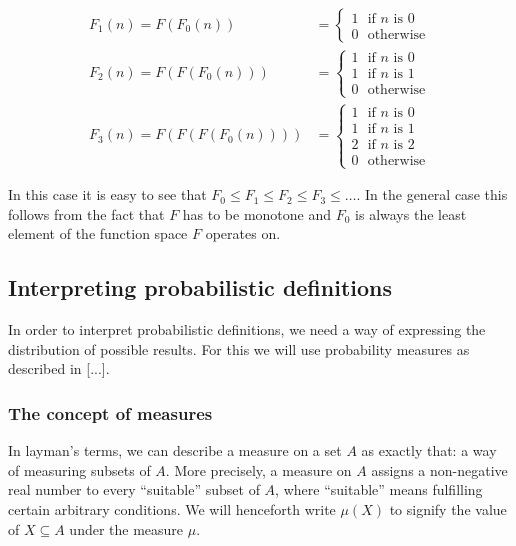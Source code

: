 \documentclass[11pt, leqno, titlepage]{article}
\theoremstyle{definition}
\begin{document}
\begin{align*}
  F_1(n) = F(F_0(n)) & = \begin{cases}
                           1~~~\text{if }n\text{ is 0}\\
                           0~~~\text{otherwise}
                         \end{cases}
  \\
  F_2(n) = F(F(F_0(n))) & = \begin{cases}
                             1~~~\text{if }n\text{ is 0}\\
                             1~~~\text{if }n\text{ is 1}\\
                             0~~~\text{otherwise}
                           \end{cases}
  \\
  F_3(n) = F(F(F(F_0(n)))) & = \begin{cases}
                                1~~~\text{if }n\text{ is 0}\\
                                1~~~\text{if }n\text{ is 1}\\
                                2~~~\text{if }n\text{ is 2}\\
                                0~~~\text{otherwise}
                              \end{cases}
\end{align*}

In this case it is easy to see that $F_0 \leq F_1 \leq F_2 \leq F_3 \leq \dots$. In
the general case this follows from the fact that $F$ has to be monotone and $F_0$ is
always the least element of the function space $F$ operates on. 


\subsection{Interpreting probabilistic definitions}\label{sec:prob-interp}
In order to interpret probabilistic definitions, we need a way of expressing
the distribution of possible results. For this we will use probability measures as
described in [...].%

\subsubsection{The concept of measures}
In layman's terms, we can describe a measure on a set $A$ as exactly that: a way of
measuring subsets of $A$. More precisely, a measure on $A$ assigns a non-negative
real number to every ``suitable'' subset of $A$, where ``suitable'' means fulfilling
certain arbitrary conditions. We will henceforth write $\mu (X)$ to signify the value
of $X \subseteq A$ under the measure $\mu$. 
\end{document}
